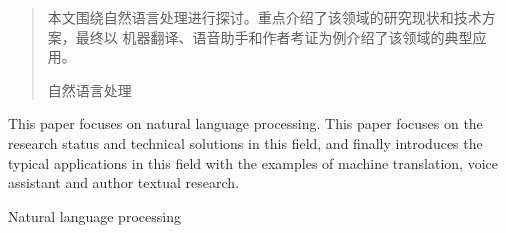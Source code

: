 \documentclass[../main]{subfiles}
\begin{document}
\begin{abstract}
  本文围绕自然语言处理进行探讨。重点介绍了该领域的研究现状和技术方案，最终以
  机器翻译、语音助手和作者考证为例介绍了该领域的典型应用。

  \begin{keyword}
    自然语言处理
  \end{keyword}
\end{abstract}

\begin{abstract*}
  This paper focuses on natural language processing. This paper focuses on
  the research status and technical solutions in this field, and finally
  introduces the typical applications in this field with the examples of
  machine translation, voice assistant and author textual research.

  \begin{keyword*}
    Natural language processing
  \end{keyword*}
\end{abstract*}
\end{document}
